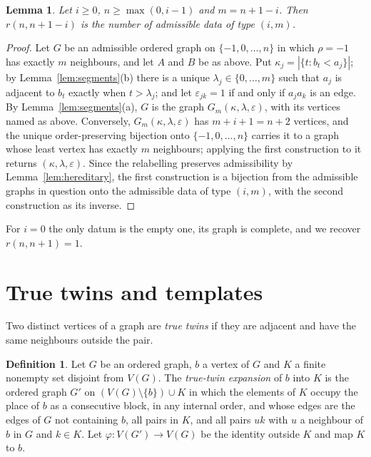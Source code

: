 \documentclass[11pt]{amsart}
\newtheorem{lemma}[theorem]{Lemma}
\theoremstyle{definition}
\newtheorem{definition}[theorem]{Definition}
\theoremstyle{remark}
\numberwithin{equation}{section}
\begin{document}
\begin{lemma}\label{lem:encoding}
Let $i\ge0$, $n\ge\max(0,i-1)$ and $m=n+1-i$. Then $r(n,n+1-i)$ is the number of admissible data of type $(i,m)$.
\end{lemma}

\begin{proof}
Let $G$ be an admissible ordered graph on $\{-1,0,\dots,n\}$ in which $\rho=-1$ has exactly $m$ neighbours, and let $A$ and $B$ be as above. Put $\kappa_j=|\{t:b_t<a_j\}|$; by Lemma~\ref{lem:segments}(b) there is a unique $\lambda_j\in\{0,\dots,m\}$ such that $a_j$ is adjacent to $b_t$ exactly when $t>\lambda_j$; and let $\varepsilon_{jk}=1$ if and only if $a_ja_k$ is an edge. By Lemma~\ref{lem:segments}(a), $G$ is the graph $G_m(\kappa,\lambda,\varepsilon)$, with its vertices named as above. Conversely, $G_m(\kappa,\lambda,\varepsilon)$ has $m+i+1=n+2$ vertices, and the unique order-preserving bijection onto $\{-1,0,\dots,n\}$ carries it to a graph whose least vertex has exactly $m$ neighbours; applying the first construction to it returns $(\kappa,\lambda,\varepsilon)$. Since the relabelling preserves admissibility by Lemma~\ref{lem:hereditary}, the first construction is a bijection from the admissible graphs in question onto the admissible data of type $(i,m)$, with the second construction as its inverse.
\end{proof}

For $i=0$ the only datum is the empty one, its graph is complete, and we recover $r(n,n+1)=1$.

\section{True twins and templates}\label{sec:templates}

Two distinct vertices of a graph are \emph{true twins} if they are adjacent and have the same neighbours outside the pair.

\begin{definition}
Let $G$ be an ordered graph, $b$ a vertex of $G$ and $K$ a finite nonempty set disjoint from $V(G)$. The \emph{true-twin expansion} of $b$ into $K$ is the ordered graph $G'$ on $(V(G)\setminus\{b\})\cup K$ in which the elements of $K$ occupy the place of $b$ as a consecutive block, in any internal order, and whose edges are the edges of $G$ not containing $b$, all pairs in $K$, and all pairs $uk$ with $u$ a neighbour of $b$ in $G$ and $k\in K$. Let $\varphi\colon V(G')\to V(G)$ be the identity outside $K$ and map $K$ to $b$.
\end{definition}
\end{document}
